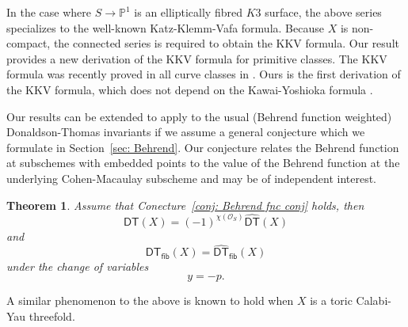 \documentclass{amsart}
\newtheorem{theorem}{Theorem}%
\theoremstyle{definition}
\newcommand{\PP} {\mathbb{P}}
\renewcommand{\O}{\mathcal{O}}
\newcommand{\DT}{\mathsf{DT}}
\newcommand{\DThat}{\widehat{\DT}}
\newcommand{\fiber}{\mathsf{fib}}
\begin{document}
In the case where $S \rightarrow \PP^1$ is an elliptically fibred $K3$
surface, the above series specializes to the well-known
Katz-Klemm-Vafa formula. Because $X$ is non-compact, the connected
series is required to obtain the KKV formula. Our result provides a
new derivation of the KKV formula for primitive classes. The KKV
formula was recently proved in all curve classes in
\cite{Pandharipande-Thomas-KKV}. Ours is the first derivation of the
KKV formula, which does not depend on the Kawai-Yoshioka formula
\cite{Kawai-Yoshioka}.

Our results can be extended to apply to the usual (Behrend function
weighted) Donaldson-Thomas invariants if we assume a general
conjecture which we formulate in Section~\ref{sec: Behrend}. Our
conjecture relates the Behrend function at subschemes with embedded
points to the value of the Behrend function at the underlying
Cohen-Macaulay subscheme and may be of independent interest.

\begin{theorem}\label{thm: DT(X) assuming the Behrend functionconjecture}
Assume that Conecture~\ref{conj: Behrend fnc conj} holds, then
\[
\DT (X) = (-1)^{\chi (\O_{S})} \DThat (X)
\]
and
\[
\DT_{\fiber } (X) =  \DThat_{\fiber } (X)
\]
under the change of variables
\[
y=-p.
\]
\end{theorem}

A similar phenomenon to the above is known to hold when $X$ is a toric
Calabi-Yau threefold.
\end{document}
